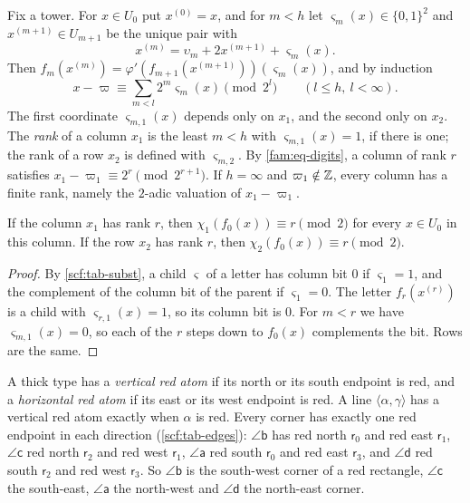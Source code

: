 Fix a tower. For $x\in U_0$ put $x^{(0)}=x$, and for $m<h$ let $\varsigma_m(x)\in\{0,1\}^2$ and $x^{(m+1)}\in U_{m+1}$ be the unique pair with
\[
x^{(m)}=\upsilon_m+2x^{(m+1)}+\varsigma_m(x).
\]
Then $f_m(x^{(m)})=\varphi'(f_{m+1}(x^{(m+1)}))(\varsigma_m(x))$, and by induction
\begin{equation}\label{fam:eq-digits}
x-\varpi\equiv\sum_{m<l}2^m\varsigma_m(x)\pmod{2^l}\qquad(l\le h,\ l<\infty).
\end{equation}
The first coordinate $\varsigma_{m,1}(x)$ depends only on $x_1$, and the second only on $x_2$. The \emph{rank} of a column $x_1$ is the least $m<h$ with $\varsigma_{m,1}(x)=1$, if there is one; the rank of a row $x_2$ is defined with $\varsigma_{m,2}$. By \eqref{fam:eq-digits}, a column of rank $r$ satisfies $x_1-\varpi_1\equiv 2^r\pmod{2^{r+1}}$. If $h=\infty$ and $\varpi_1\notin\mathbb{Z}$, every column has a finite rank, namely the $2$-adic valuation of $x_1-\varpi_1$.

\begin{lemma}\label{fam:rank-bits}
If the column $x_1$ has rank $r$, then $\chi_1(f_0(x))\equiv r\pmod 2$ for every $x\in U_0$ in this column. If the row $x_2$ has rank $r$, then $\chi_2(f_0(x))\equiv r\pmod2$.
\end{lemma}

\begin{proof}
By \cref{scf:tab-subst}, a child $\varsigma$ of a letter has column bit $0$ if $\varsigma_1=1$, and the complement of the column bit of the parent if $\varsigma_1=0$. The letter $f_r(x^{(r)})$ is a child with $\varsigma_{r,1}(x)=1$, so its column bit is $0$. For $m<r$ we have $\varsigma_{m,1}(x)=0$, so each of the $r$ steps down to $f_0(x)$ complements the bit. Rows are the same.
\end{proof}

A thick type has a \emph{vertical red atom} if its north or its south endpoint is red, and a \emph{horizontal red atom} if its east or its west endpoint is red. A line $\langle\alpha,\gamma\rangle$ has a vertical red atom exactly when $\alpha$ is red. Every corner has exactly one red endpoint in each direction (\cref{scf:tab-edges}): $\angle\mathsf b$ has red north $\mathsf r_0$ and red east $\mathsf r_1$, $\angle\mathsf c$ red north $\mathsf r_2$ and red west $\mathsf r_1$, $\angle\mathsf a$ red south $\mathsf r_0$ and red east $\mathsf r_3$, and $\angle\mathsf d$ red south $\mathsf r_2$ and red west $\mathsf r_3$. So $\angle\mathsf b$ is the south-west corner of a red rectangle, $\angle\mathsf c$ the south-east, $\angle\mathsf a$ the north-west and $\angle\mathsf d$ the north-east corner.

